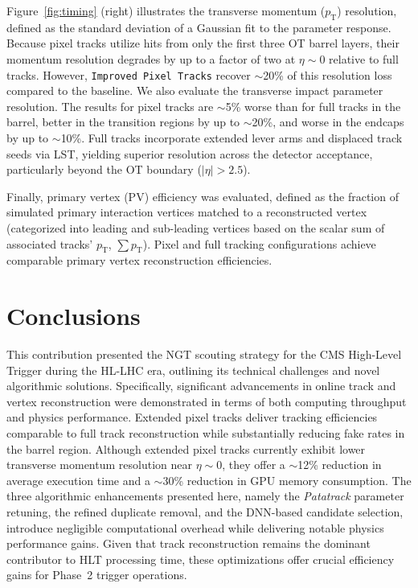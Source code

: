 \documentclass[a4paper,11pt]{article}
\newcommand{\sm}{\ensuremath{\sim}}
\begin{document}
Figure~\ref{fig:timing} (right) illustrates the transverse momentum ($p_\mathrm{T}$) resolution, defined as the standard deviation of a Gaussian fit to the parameter response.
Because pixel tracks utilize hits from only the first three OT barrel layers, their momentum resolution degrades by up to a factor of two at $\eta \sim 0$ relative to full tracks.
However, \texttt{Improved Pixel Tracks} recover \sm20\% of this resolution loss compared to the baseline.
We also evaluate the transverse impact parameter resolution.
The results for pixel tracks are \sm5\% worse than for full tracks in the barrel, better in the transition regions by up to \sm20\%, and worse in the endcaps by up to \sm10\%.
Full tracks incorporate extended lever arms and displaced track seeds via LST, yielding superior resolution across the detector acceptance, particularly beyond the OT boundary ($|\eta| > 2.5$).
\par
%
Finally, primary vertex (PV) efficiency was evaluated, defined as the fraction of simulated primary interaction vertices matched to a reconstructed vertex (categorized into leading and sub-leading vertices based on the scalar sum of associated tracks' $p_\mathrm{T}$, $\sum p_\mathrm{T}$).
Pixel and full tracking configurations achieve comparable primary vertex reconstruction efficiencies.
%
\section{Conclusions}
\label{sec:conclusions}
%
This contribution presented the NGT scouting strategy for the CMS High-Level Trigger during the HL-LHC era, outlining its technical challenges and novel algorithmic solutions.
Specifically, significant advancements in online track and vertex reconstruction were demonstrated in terms of both computing throughput and physics performance.
Extended pixel tracks deliver tracking efficiencies comparable to full track reconstruction while substantially reducing fake rates in the barrel region.
Although extended pixel tracks currently exhibit lower transverse momentum resolution near $\eta \sim 0$, they offer a \sm12\% reduction in average execution time and a \sm30\% reduction in GPU memory consumption.
The three algorithmic enhancements presented here, namely the \textit{Patatrack} parameter retuning, the refined duplicate removal, and the DNN-based candidate selection, introduce negligible computational overhead while delivering notable physics performance gains.
Given that track reconstruction remains the dominant contributor to HLT processing time, these optimizations offer crucial efficiency gains for Phase~2 trigger operations. \par
\end{document}
